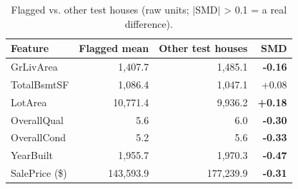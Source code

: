\begin{table}[t]
\centering
\small
\begin{tabular}{lrrr}
\toprule
Feature & Flagged mean & Other test houses & SMD \\
\midrule
GrLivArea & 1,407.7 & 1,485.1 & \textbf{-0.16} \\
TotalBsmtSF & 1,086.4 & 1,047.1 & +0.08 \\
LotArea & 10,771.4 & 9,936.2 & \textbf{+0.18} \\
OverallQual & 5.6 & 6.0 & \textbf{-0.30} \\
OverallCond & 5.2 & 5.6 & \textbf{-0.33} \\
YearBuilt & 1,955.7 & 1,970.3 & \textbf{-0.47} \\
SalePrice (\$) & 143,593.9 & 177,239.9 & \textbf{-0.31} \\
\bottomrule
\end{tabular}
\caption{Flagged vs. other test houses (raw units; $|$SMD$|$ > 0.1 = a real difference).}
\label{tab:error_compare}
\end{table}
